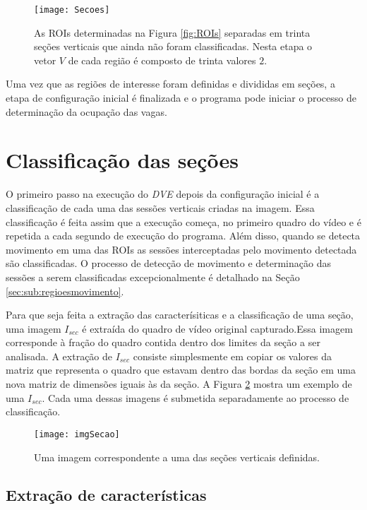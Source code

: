 \begin{figure}
	\centering
	\texttt{[image: Secoes]}
	\caption{As ROIs determinadas na Figura \ref{fig:ROIs} separadas em trinta seções verticais que ainda não foram classificadas. Nesta etapa o vetor $V$ de cada região é composto de trinta valores $2$.}
	\label{fig:secoesVerticais}
	\centering
\end{figure}


Uma vez que as regiões de interesse foram definidas e divididas em seções, a etapa de configuração inicial é finalizada e o programa pode iniciar o processo de determinação da ocupação das vagas. 

\section{Classificação das seções} \label{sec:classificacao}

O primeiro passo na execução do \textit{DVE} depois da configuração inicial é a classificação de cada uma das sessões verticais criadas na imagem. Essa classificação é feita assim que a execução começa, no primeiro quadro do vídeo e é repetida a cada segundo de execução do programa. Além disso, quando se detecta movimento em uma das ROIs as sessões interceptadas pelo movimento detectada são classificadas. O processo de detecção de movimento e determinação das sessões a serem classificadas excepcionalmente é detalhado na Seção \ref{sec:sub:regioesmovimento}.

Para que seja feita a extração das caracterísiticas e a classificação de uma seção, uma imagem $I_{sec}$ é extraída do quadro de vídeo original capturado.Essa imagem corresponde à fração do quadro contida dentro dos limites da seção a ser analisada. A extração de $I_{sec}$ consiste simplesmente em copiar os valores da matriz que representa o quadro que estavam dentro das bordas da seção em uma nova matriz de dimensões iguais às da seção. A Figura \ref{fig:imgSecao} mostra um exemplo de uma $I_{sec}$. Cada uma dessas imagens é submetida separadamente ao processo de classificação.

\begin{figure}
	\centering
	\texttt{[image: imgSecao]}
	\caption{Uma imagem correspondente a uma das seções verticais definidas.}
	\label{fig:imgSecao}
	\centering
\end{figure}


\subsection{Extração de características}\label{sec:extracao}

